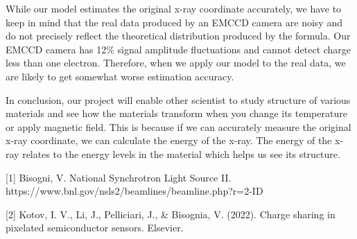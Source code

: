 \documentclass{article}
\begin{document}
While our model estimates the original x-ray coordinate accurately, we have to keep in mind that the real data produced by an EMCCD camera are noisy and do not precisely reflect the theoretical distribution produced by the formula. Our EMCCD camera has 12\% signal amplitude fluctuations and cannot detect charge less than one electron. Therefore, when we apply our model to the real data, we are likely to get somewhat worse estimation accuracy.

In conclusion, our project will enable other scientist to study structure of various materials and see how the materials transform when you change its temperature or apply magnetic field. This is because if we can accurately measure the original x-ray coordinate, we can calculate the energy of the x-ray. The energy of the x-ray relates to the energy levels in the material which helps us see its structure.


\newpage


\sloppy

[1] Bisogni, V. National Synchrotron Light Source II. https://www.bnl.gov/nsls2/beamlines/beamline.php?r=2-ID

[2] Kotov, I. V., Li, J., Pelliciari, J., & Bisognia, V. (2022). Charge sharing in pixelated semiconductor sensors. Elsevier.
\end{document}
